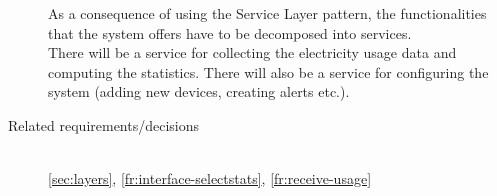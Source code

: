 \begin{description}
As a consequence of using the Service Layer pattern, the functionalities that the system offers have to be decomposed into services. \\
There will be a service for collecting the electricity usage data and computing the statistics. There will also be a service for configuring the system (adding new devices, creating alerts etc.).

\item [Related requirements/decisions]~\\
\ref{sec:layers}, \ref{fr:interface-selectstats}, \ref{fr:receive-usage}

\end{description}


%
%
%
%
%



